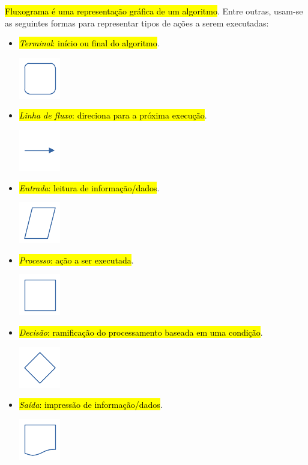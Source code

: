 \hl{Fluxograma é uma representação gráfica de um algoritmo}. Entre outras, usam-se as seguintes formas para representar tipos de ações a serem executadas:
\begin{itemize}
\item \hl{\emph{Terminal}: início ou final do algoritmo}.
  \begin{center}
    \includegraphics{./cap_lingua/dados/fig_fluxograma/terminal}
  \end{center}  
\item \hl{\emph{Linha de fluxo}: direciona para a próxima execução}.
  \begin{center}
    \includegraphics{./cap_lingua/dados/fig_fluxograma/linha}
  \end{center}
\item \hl{\emph{Entrada}: leitura de informação/dados}.
  \begin{center}
    \includegraphics{./cap_lingua/dados/fig_fluxograma/entrada}
  \end{center}  
\item \hl{\emph{Processo}: ação a ser executada}.
  \begin{center}
    \includegraphics{./cap_lingua/dados/fig_fluxograma/processo}
  \end{center}
\item \hl{\emph{Decisão}: ramificação do processamento baseada em uma condição}.
  \begin{center}
    \includegraphics{./cap_lingua/dados/fig_fluxograma/decisao}
  \end{center}
\item \hl{\emph{Saída}: impressão de informação/dados}.
  \begin{center}
    \includegraphics{./cap_lingua/dados/fig_fluxograma/saida}
\end{center}
\end{itemize}

